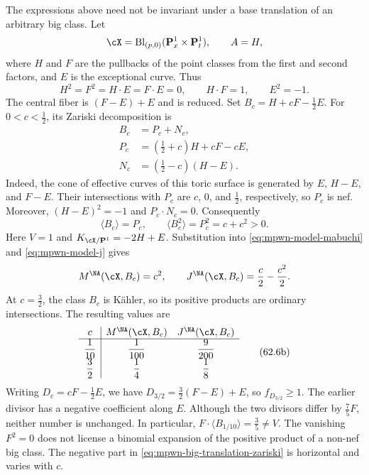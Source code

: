 \begin{example}
\label{ex:mpwn-big-translation-failure}
The expressions above need not be invariant under a base translation
of an arbitrary big class.  Let
\[
 \cX=\operatorname{Bl}_{(p,0)}
          (\mathbf P^1_x\times\mathbf P^1_t),
 \qquad A=H,
\]
where $H$ and $F$ are the pullbacks of the point classes from the first
and second factors, and $E$ is the exceptional curve.  Thus
\[
 H^2=F^2=H\cdot E=F\cdot E=0,\qquad
 H\cdot F=1,\qquad E^2=-1.
\]
The central fiber is $(F-E)+E$ and is reduced.  Set
$B_c=H+cF-\frac12E$.  For $0<c<\frac12$, its Zariski decomposition is
\[
 \begin{split}
 B_c&=P_c+N_c,\\
 P_c&=\left(\frac12+c\right)H+cF-cE,\\
 N_c&=\left(\frac12-c\right)(H-E).
 \end{split}
 \tag{62.6a}\label{eq:mpwn-big-translation-zariski}
\]
Indeed, the cone of effective curves of this toric surface is generated
by $E$, $H-E$, and $F-E$.  Their intersections with $P_c$ are
$c$, $0$, and $\frac12$, respectively, so $P_c$ is nef.
Moreover, $(H-E)^2=-1$ and $P_c\cdot N_c=0$.
Consequently
\[
 \langle B_c\rangle=P_c,\qquad
 \langle B_c^2\rangle=P_c^2=c+c^2>0.
\]
Here $V=1$ and $K_{\cX/\mathbf P^1}=-2H+E$.  Substitution into
\eqref{eq:mpwn-model-mabuchi} and \eqref{eq:mpwn-model-j} gives
\[
 M^{\NA}(\cX,B_c)=c^2,\qquad
 J^{\NA}(\cX,B_c)=\frac c2-\frac{c^2}{2}.
\]
At $c=\frac32$, the class $B_c$ is K\"ahler, so its positive products
are ordinary intersections.  The resulting values are
\begingroup
\renewcommand{\arraystretch}{1.8}
\[
 \begin{array}{c|cc}
 c&M^{\NA}(\cX,B_c)&J^{\NA}(\cX,B_c)\\ \hline
 \dfrac1{10}&\dfrac1{100}&\dfrac9{200}\\
 \dfrac32&\dfrac14&\dfrac18
 \end{array}
 \tag{62.6b}\label{eq:mpwn-big-translation-values}
\]
\endgroup
Writing $D_c=cF-\frac12E$, we have
$D_{3/2}=\frac32(F-E)+E$, so $f_{D_{3/2}}\geq1$.
The earlier divisor has a negative coefficient along $E$.
Although the two divisors differ by $\frac75F$, neither number is
unchanged.  In particular,
$F\cdot\langle B_{1/10}\rangle=\frac35\ne V$.
The vanishing $F^2=0$ does not license a binomial expansion of the
positive product of a non-nef big class.  The negative part in
\eqref{eq:mpwn-big-translation-zariski} is horizontal and varies with $c$.
\end{example}

